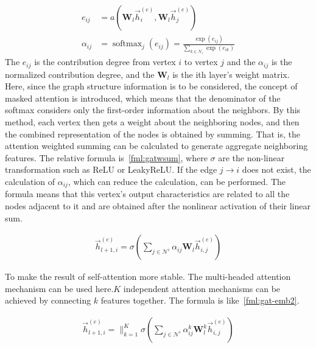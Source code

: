 \begin{align}
	e_{ij}      & =a(\mathbf{W}_l\overrightarrow{h}^{(e)}_i, \mathbf{W}_l\overrightarrow{h}^{(e)}_j)    \label{fml:gatembeij}                \\
	\alpha_{ij} & =\operatorname{softmax}_{j}(e_{ij})=\frac{\exp(e_{ij})}{\sum_{k\in \mathcal{N}_{i}}\exp(e_{ik})} \label{fml:gatembalphaij}
\end{align}
The \(e_{ij}\) is the contribution degree from vertex \(i\) to vertex \(j\) and the \(\alpha_{ij} \) is the normalized contribution degree, and the \(\mathbf{W}_l\) is the ith layer's weight matrix. Here, since the graph structure information is to be considered, the concept of masked attention is introduced, which means that the denominator of the softmax considers only the first-order information about the neighbors. By this method, each vertex then gets a weight about the neighboring nodes, and then the combined representation of the nodes is obtained by summing. That is, the attention weighted summing can be calculated to generate aggregate neighboring features. The relative formula is~\ref{fml:gatwsum}, where \(\sigma \) are the non-linear transformation such as ReLU or LeakyReLU. If the edge \(j \to i\) does not exist,  the calculation of \(\alpha_{ij}\), which can reduce the calculation, can be performed. The formula means that this vertex's output characteristics are related to all the nodes adjacent to it and are obtained after the nonlinear activation of their linear sum.

\begin{align}
	\overrightarrow{h}^{(e)}_{l+1,i}=\sigma(\sum_{j \in \mathcal{N}^i} \alpha_{i j} \mathbf{W}_l \overrightarrow{h}^{(e)}_{i,j})\label{fml:gatwsum}
\end{align}



To make the result of self-attention more stable. The multi-headed attention mechanism can be used here.\(K\) independent attention mechanisms can be achieved by connecting \(k\) features together. The formula is like~\ref{fml:gat-emb2}.

\begin{align}
	\overrightarrow{h}^{(e)}_{l+1,i}=\|_{k=1}^{K} \sigma(\sum_{j \in \mathcal{N}^i} \alpha_{i j}^{k} \mathbf{W}_l^{k} \overrightarrow{h}^{(e)}_{i,j})\label{fml:gat-emb2}
\end{align}

